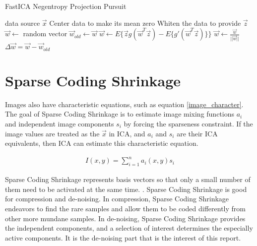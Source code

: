 \documentclass[11pt]{article}
\begin{document}
\begin{algorithm}
\caption{FastICA  Negentropy Projection Pursuit}
\label{alg:FastICA-Negentropy-Projection-Pursuit}
\begin{algorithmic}
	\REQUIRE data source $\vec{x}$
	\STATE Center data to make its mean zero
	\STATE Whiten the data to provide $\vec{z}$
	\STATE $\vec{w} \leftarrow$ random vector
	\REPEAT
		\STATE $\vec{w}_{old} \leftarrow \vec{w}$
		\STATE $\vec{w} \leftarrow E \{ \vec{z} g(\vec{w}^T \vec{z}) - E\{ g' (\vec{w}^T \vec{z}) \} \}$
		\STATE $\vec{w} \leftarrow \frac{\vec{w}}{||\vec{w}||}$
		\STATE $\Delta \vec{w} = \vec{w} - \vec{w}_{old}$
\end{algorithmic}
\end{algorithm}

\section{Sparse Coding Shrinkage}\label{sparse-coding-shrinkage}
Images also have characteristic equations, such as  equation \ref{image_character}.  The goal of Sparse Coding Shrinkage is to estimate image mixing functions $a_i$ and independent image components $s_i$ by forcing the sparseness constraint.  %
If the image values are treated as the $\vec{x}$ in ICA, and $a_i$ and $s_i$ are their ICA equivalents, then ICA can estimate this characteristic equation. 

\begin{eqnarray}
I(x,y) = \sum _{i =1 }^n  a_i (x,y) s_i \label{image_character}%
\end{eqnarray}


Sparse Coding Shrinkage represents basis vectors so that only a small number of them need to be activated at the same time.  \cite[397]{appo-ica-book}.  Sparse Coding Shrinkage is good for compression and de-noising.   In compression, Sparse Coding Shrinkage endeavors to find the rare samples and allow them to be coded differently from other more mundane samples.   In de-noising, Sparse Coding Shrinkage provides the independent components, and a selection of interest determines the especially active components.  It is the de-noising part that is the interest of this report. 
\end{document}
